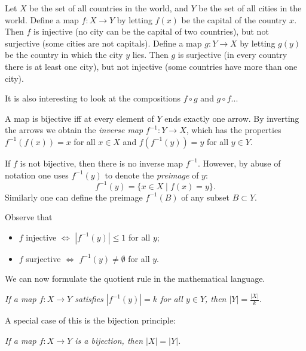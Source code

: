 \begin{page}

\begin{exl}
Let $X$ be the set of all countries in the world, and $Y$ be the set of all cities in the world.
Define a map $f \colon X \to Y$ by letting $f(x)$ be the capital of the country $x$.
Then $f$ is injective (no city can be the capital of two countries), but not surjective (some cities are not capitals).
Define a map $g \colon Y \to X$ by letting $g(y)$ be the country in which the city $y$ lies.
Then $g$ is surjective (in every country there is at least one city), but not injective (some countries have more than one city).

It is also interesting to look at the compositions $f \circ g$ and $g \circ f$...
\end{exl}

\end{page}

\begin{page}


A map is bijective iff at every element of $Y$ ends exactly one arrow.
By inverting the arrows we obtain the \emph{inverse map} $f^{-1} \colon Y \to X$,
which has the properties $f^{-1}(f(x)) = x$ for all $x \in X$ and $f(f^{-1}(y)) = y$ for all $y \in Y$.

If $f$ is not bijective, then there is no inverse map $f^{-1}$.
However, by abuse of notation one uses $f^{-1}(y)$ to denote the \emph{preimage} of $y$:
\[
f^{-1}(y) = \{x \in X \mid f(x) = y\}.
\]
Similarly one can define the preimage $f^{-1}(B)$ of any subset $B \subset Y$.

Observe that
\begin{itemize}
\item
$f$ injective $\Leftrightarrow$ $|f^{-1}(y)| \le 1$ for all $y$;
\item
$f$ surjective $\Leftrightarrow$ $f^{-1}(y) \ne \emptyset$ for all $y$.
\end{itemize}

We can now formulate the quotient rule in the mathematical language.

\begin{center}
\parbox{.75\textwidth}{\emph{If a map $f \colon X \to Y$ satisfies $|f^{-1}(y)| = k$ for all $y \in Y$, then $|Y| = \frac{|X|}{k}$.}}
\end{center}

A special case of this is the bijection principle:
\begin{center}
\parbox{.75\textwidth}{\emph{If a map $f \colon X \to Y$ is a bijection, then $|X| = |Y|$.}}
\end{center}



\end{page}

